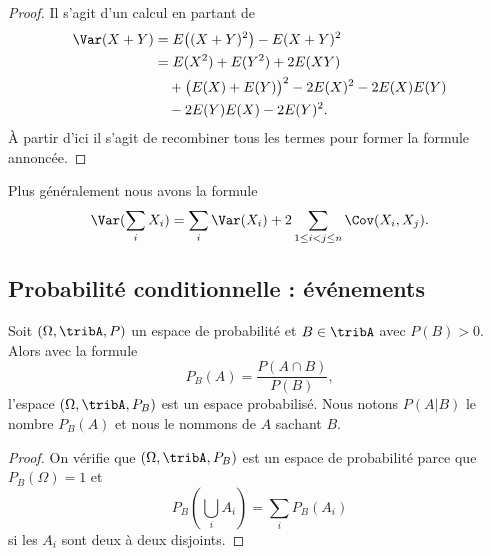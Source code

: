 \begin{proof}
	Il s'agit d'un calcul en partant de
	\begin{equation}
		\begin{aligned}[]
			\Var(X+Y) & =E\big( (X+Y)^2 \big)-E(X+Y)^2                  \\
			          & =E(X^2)+E(Y^2)+2E(XY)                           \\
			          & \quad+\big( E(X)+E(Y) \big)^2-2E(X)^2-2E(X)E(Y) \\
			          & \quad-2 E(Y)E(X)-2E(Y)^2.
		\end{aligned}
	\end{equation}
	À partir d'ici il s'agit de recombiner tous les termes pour former la formule annoncée.
\end{proof}

Plus généralement nous avons la formule
\begin{equation}
	\Var(\sum_i X_i)=\sum_i\Var(X_i)+2\sum_{1\leq i< j\leq n}\Cov(X_i,X_j).
\end{equation}

\subsection{Probabilité conditionnelle : événements}

\begin{propositionDef}      \label{DEFooGJVHooVbhVYv}
	Soit \( (\Omega,\tribA,P)\) un espace de probabilité et \( B\in\tribA\) avec \( P(B)>0\). Alors avec la formule
	\begin{equation}    \label{EqProbCond}
		P_B(A)=\frac{ P(A\cap B) }{ P(B) },
	\end{equation}
	l'espace \( (\Omega,\tribA,P_B)\) est un espace probabilisé. Nous notons \( P(A|B)\) le nombre \( P_B(A) \) et nous le nommons  de \( A\) sachant \( B\).
\end{propositionDef}

\begin{proof}
	On vérifie que \( (\Omega,\tribA,P_B)\) est un espace de probabilité parce que \( P_B(\Omega)=1\) et
	\begin{equation}
		P_B(\bigcup_iA_i)=\sum_iP_B(A_i)
	\end{equation}
	si les \( A_i\) sont deux à deux disjoints.
\end{proof}

